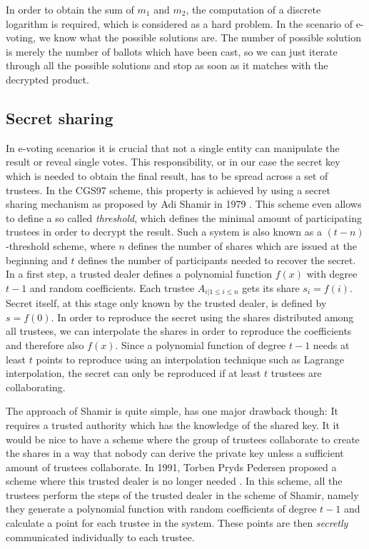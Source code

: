 \documentclass[numbers=noenddot, abstract=on, a4paper, headsepline,
footsepline, oneside, draft=off]{scrreprt}
\begin{document}
In order to obtain the sum of $m_1$ and $m_2$, the computation of a discrete
logarithm is required, which is considered as a hard problem. In the scenario of
e-voting, we know what the possible solutions are. The number of possible
solution is merely the number of ballots which have been cast, so we can just
iterate through all the possible solutions and stop as soon as it matches with
the decrypted product.


\subsection{Secret sharing}
\label{sec:secretsharing}
In e-voting scenarios it is crucial that not a
single entity can manipulate the result or reveal single votes. This
responsibility, or in our case the secret key which is needed to obtain the
final result, has to be spread across a set of trustees. In the CGS97 scheme,
this property is achieved by using a secret sharing mechanism as proposed by Adi
Shamir in 1979 \cite{Shamir79}. This scheme even allows to define a so called
\textit{threshold}, which defines the minimal amount of participating trustees
in order to decrypt the result. Such a system is also known as a
$(t-n)$-threshold scheme, where $n$ defines the number of shares which are
issued at the beginning and $t$ defines the number of participants needed to
recover the secret. In a first step, a trusted dealer defines a polynomial
function $f(x)$ with degree $t-1$ and random coefficients. Each trustee $A_{i |
1 \leq i \leq n}$ gets its share $s_i=f(i)$. Secret itself, at this stage only
known by the trusted dealer, is defined by $s=f(0)$. In order to reproduce the
secret using the shares distributed among all trustees, we can interpolate the
shares in order to reproduce the coefficients and therefore also $f(x)$. Since a
polynomial function of degree $t-1$ needs at least $t$ points to reproduce using
an interpolation technique such as Lagrange interpolation, the secret can only
be reproduced if at least $t$ trustees are collaborating. 

The approach of Shamir is quite simple, has one major drawback though: It
requires a trusted authority which has the knowledge of the shared key. It it
would be nice to have a scheme where the group of trustees collaborate to create
the shares in a way that nobody can derive the private key unless a sufficient
amount of trustees collaborate. In 1991, Torben Pryds Pedersen proposed a scheme
where this trusted dealer is no longer needed \cite{PED91}. In this scheme, all the
trustees perform the steps of the trusted dealer in the scheme of Shamir, namely
they generate a polynomial function with random coefficients of degree $t-1$ and
calculate a point for each trustee in the system. These points are then
\textit{secretly} communicated individually to each trustee.
\end{document}
